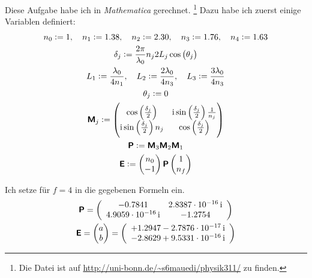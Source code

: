 Diese Aufgabe habe ich in \emph{Mathematica} gerechnet. \footnote{Die Datei ist
auf \url{http://uni-bonn.de/~s6mauedi/physik311/} zu finden.} Dazu habe ich
zuerst einige Variablen definiert:
\begin{gather*}
	n_0 := 1
	,\quad
	n_1 := 1.38
	,\quad
	n_2 := 2.30
	,\quad
	n_3 := 1.76
	,\quad
	n_4 := 1.63 \\
	\delta_j := \frac{2 \pi}{\lambda_0} n_j 2 L_j \cos\del{\theta_j} \\
	L_1 := \frac{\lambda_0}{4 n_1}
	,\quad
	L_2 := \frac{2 \lambda_0}{4 n_3}
	,\quad
	L_3 := \frac{3 \lambda_0}{4 n_3} \\
	\theta_j := 0 \\
	\tens M_j := \begin{pmatrix}
		\cos\del{\frac{\delta_j}{2}} &
		\ii \sin\del{\frac{\delta_j}{2}} \frac{1}{n_j} \\
		\ii \sin\del{\frac{\delta_j}{2}} n_j &
		\cos\del{\frac{\delta_j}{2}}
	\end{pmatrix} \\
	\tens P := \tens M_3 \tens M_2 \tens M_1 \\
	\tens E :=
	\begin{pmatrix}
		n_0 \\ -1
	\end{pmatrix}
	\tens P
	\begin{pmatrix}
		1 \\ n_f
	\end{pmatrix}
\end{gather*}

Ich setze für $f = 4$ in die gegebenen Formeln ein.
\begin{gather*}
	\tens P
	=
	\left(
\begin{array}{cc}
 -0.7841& 2.8387\e{-16} \, \ii \\
 4.9059\e{-16}  \,\ii & -1.2754 \\
\end{array}
\right) \\
%
	\tens E
	=
	\begin{pmatrix}
		a \\ b
	\end{pmatrix}
	=
	\left(
	\begin{array}{c}
		+1.2947 -2.7876\e{-17} \, \ii \\
		-2.8629 +9.5331\e{-16} \, \ii \\
	\end{array}
	\right)
\end{gather*}

